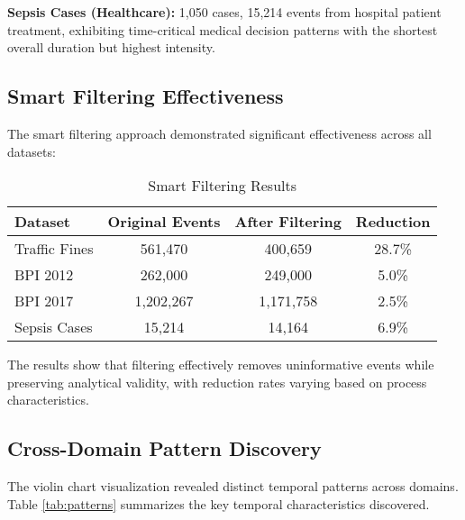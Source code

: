\documentclass[11pt,a4paper]{article}
\begin{document}
\textbf{Sepsis Cases (Healthcare):} 1,050 cases, 15,214 events from hospital patient treatment, exhibiting time-critical medical decision patterns with the shortest overall duration but highest intensity.

\subsection{Smart Filtering Effectiveness}

The smart filtering approach demonstrated significant effectiveness across all datasets:

\begin{table}[H]
\centering
\caption{Smart Filtering Results}
\begin{tabular}{@{}lccc@{}}
\toprule
Dataset & Original Events & After Filtering & Reduction \\
\midrule
Traffic Fines & 561,470 & 400,659 & 28.7\% \\
BPI 2012 & 262,000 & 249,000 & 5.0\% \\
BPI 2017 & 1,202,267 & 1,171,758 & 2.5\% \\
Sepsis Cases & 15,214 & 14,164 & 6.9\% \\
\bottomrule
\end{tabular}
\end{table}

The results show that filtering effectively removes uninformative events while preserving analytical validity, with reduction rates varying based on process characteristics.

\subsection{Cross-Domain Pattern Discovery}

The violin chart visualization revealed distinct temporal patterns across domains. Table \ref{tab:patterns} summarizes the key temporal characteristics discovered.
\end{document}
